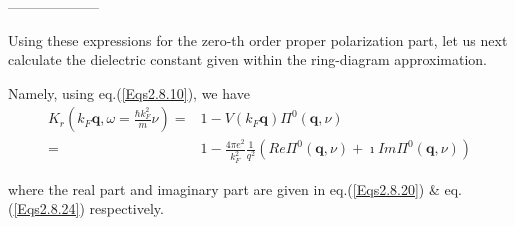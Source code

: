 \begin{center}--------------------\end{center}

Using these expressions for the zero-th order proper polarization part, let us next calculate the dielectric constant given within the ring-diagram approximation.

Namely, using eq.(\ref{Eqs2.8.10}), we have
\begin{equation} \label{Eqs2.8.28} \begin{split}
K_r(k_F \mathbf{q}, \omega= \frac{\hbar k_F^2}{m}\nu) =& 1- V(k_F \mathbf{q}) \Pi^0(\mathbf{q},\nu)\\
=& 1- \frac{4\pi e^2}{k_F^2}\frac{1}{q^2} \left( Re\Pi^0(\mathbf{q},\nu)+\imath Im\Pi^0(\mathbf{q},\nu) \right)
\end{split}\end{equation}

where the real part and imaginary part are given in eq.(\ref{Eqs2.8.20}) \& eq.(\ref{Eqs2.8.24}) respectively.

